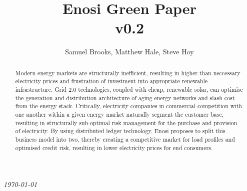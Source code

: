 \documentclass{article}
\theoremstyle{definition}
\theoremstyle{plain} %
\begin{document}

\title{Enosi Green Paper\\ v0.2}
\author{Samuel Brooks, Matthew Hale, Steve Hoy}
\date{}

\maketitle

\hfill

\begin{abstract}
\noindent Modern energy markets are structurally inefficient, resulting in higher-than-neccessary electricity prices and frustration of investment into appropriate renewable infrastructure.
Grid 2.0 technologies, coupled with cheap, renewable solar, can optimise the generation and distribution architecture of aging energy networks and slash cost from the energy stack.
Critically, electricity companies in commercial competition with one another within a given energy market naturally segment the customer base, resulting in structurally sub-optimal risk management for the purchase and provision of electricity. By using distributed ledger technology, Enosi proposes to split this business model into two, thereby creating a competitive market for load profiles and optimised credit risk, resulting in lower electricity prices for end consumers.
\end{abstract}
\vspace{20mm}
\begin{center}
  \small{\textit{\today}}
\end{center}


\pagebreak

\tableofcontents


\pagebreak

%
%
%



%
%

%
%
\end{document}
